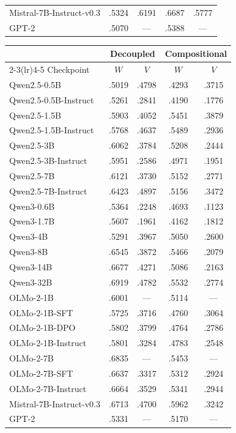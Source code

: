 \begin{table}[t]
\begin{tabular}{l*{4}{c}}
\addlinespace
Mistral-7B-Instruct-v0.3 & .5324 & .6191 & .6687 & .5777 \\
 GPT-2 & .5070 & --- & .5388 & --- \\
\bottomrule
\end{tabular}
\vspace{4pt}
\begin{tabular}{l*{4}{c}}
\toprule
 & \multicolumn{2}{c}{Decoupled} & \multicolumn{2}{c}{Compositional} \\
\cmidrule(lr){2-3}\cmidrule(lr){4-5}
Checkpoint & $W$ & $V$ & $W$ & $V$ \\
\midrule
{} Qwen2.5-0.5B & .5019 & .4798 & .4293 & .3715 \\
Qwen2.5-0.5B-Instruct & .5261 & .2841 & .4190 & .1776 \\
 Qwen2.5-1.5B & .5903 & .4052 & .5451 & .3879 \\
Qwen2.5-1.5B-Instruct & .5768 & .4637 & .5489 & .2936 \\
 Qwen2.5-3B & .6062 & .3784 & .5208 & .2444 \\
Qwen2.5-3B-Instruct & .5951 & .2586 & .4971 & .1951 \\
 Qwen2.5-7B & .6121 & .3730 & .5152 & .2771 \\
Qwen2.5-7B-Instruct & .6423 & .4897 & .5156 & .3472 \\
\addlinespace
Qwen3-0.6B & .5364 & .2248 & .4693 & .1123 \\
Qwen3-1.7B & .5607 & .1961 & .4162 & .1812 \\
Qwen3-4B & .5291 & .3967 & .5050 & .2600 \\
Qwen3-8B & .6545 & .3872 & .5466 & .2079 \\
Qwen3-14B & .6677 & .4271 & .5086 & .2163 \\
Qwen3-32B & .6919 & .4782 & .5532 & .2774 \\
\addlinespace
{} OLMo-2-1B & .6001 & --- & .5114 & --- \\
OLMo-2-1B-SFT & .5725 & .3716 & .4760 & .3064 \\
OLMo-2-1B-DPO & .5802 & .3799 & .4764 & .2786 \\
OLMo-2-1B-Instruct & .5801 & .3284 & .4783 & .2548 \\
 OLMo-2-7B & .6835 & --- & .5453 & --- \\
OLMo-2-7B-SFT & .6637 & .3317 & .5312 & .2924 \\
OLMo-2-7B-Instruct & .6664 & .3529 & .5341 & .2944 \\
\addlinespace
Mistral-7B-Instruct-v0.3 & .6713 & .4700 & .5962 & .3242 \\
 GPT-2 & .5331 & --- & .5170 & --- \\
\bottomrule
\end{tabular}
\end{table}
